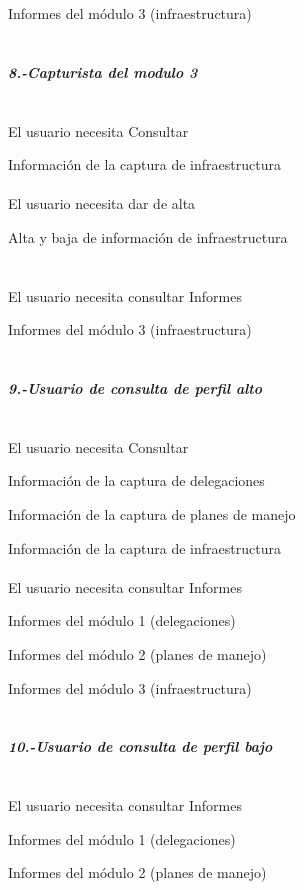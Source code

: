 \textbullet Informes del módulo 3 (infraestructura)\\\\\\
{\large \textit{\textbf{8.-Capturista del modulo 3}}}\\\\\\
\textbullet El usuario necesita Consultar 

\textbullet Información de la captura de infraestructura\\\\
\textbullet El usuario necesita dar de alta

\textbullet Alta y baja de información de infraestructura\\\\\\
\textbullet El usuario necesita consultar Informes

\textbullet Informes del módulo 3 (infraestructura)\\\\\\
{\large \textit{\textbf{9.-Usuario de consulta de perfil alto}}}\\\\\\
\textbullet El usuario necesita Consultar 

\textbullet Información de la captura de delegaciones

\textbullet Información de la captura de planes de manejo

\textbullet Información de la captura de infraestructura\\\\
\textbullet El usuario necesita consultar Informes

\textbullet Informes del módulo 1 (delegaciones)

\textbullet Informes del módulo 2 (planes de manejo)

\textbullet Informes del módulo 3 (infraestructura)\\\\\\
{\large \textit{\textbf{10.-Usuario de consulta de perfil bajo}}}\\\\\\
\textbullet El usuario necesita consultar Informes

\textbullet Informes del módulo 1 (delegaciones)

\textbullet Informes del módulo 2 (planes de manejo)

